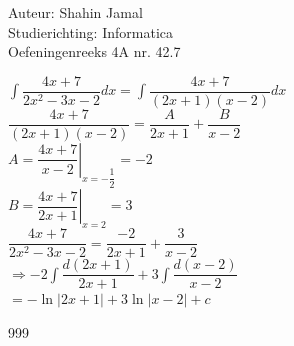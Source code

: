 \documentclass[a4paper]{article}
\begin{document}
  
\noindent \large Auteur: Shahin Jamal \\
\noindent \large Studierichting: Informatica\\
\noindent \large Oefeningenreeks 4A nr. 42.7\\

\medskip

\normalsize

$\displaystyle\int\dfrac{4x+7}{2x^2-3x-2}dx = \displaystyle\int\dfrac{4x+7}{(2x+1)(x-2)}dx$\\

$\dfrac{4x+7}{(2x+1)(x-2)} = \dfrac{A}{2x+1} + \dfrac{B}{x-2}$\\

$A = \left . \dfrac{4x+7}{x-2} \right |_{x=-\dfrac{1}{2}} = -2 $\\

$B = \left . \dfrac{4x+7}{2x+1} \right |_{x=2} = 3 $\\

$\dfrac{4x+7}{2x^2-3x-2} = \dfrac{-2}{2x+1} + \dfrac{3}{x-2}$\\

$\Rightarrow -2\displaystyle\int\dfrac{d(2x+1)}{2x+1} + 3\displaystyle\int\dfrac{d(x-2)}{x-2}$\\

$= -\ln\lvert 2x+1 \rvert + 3\ln\lvert x-2 \rvert + c$\\

\begin{thebibliography}{999}
\end{thebibliography}
\end{document}
